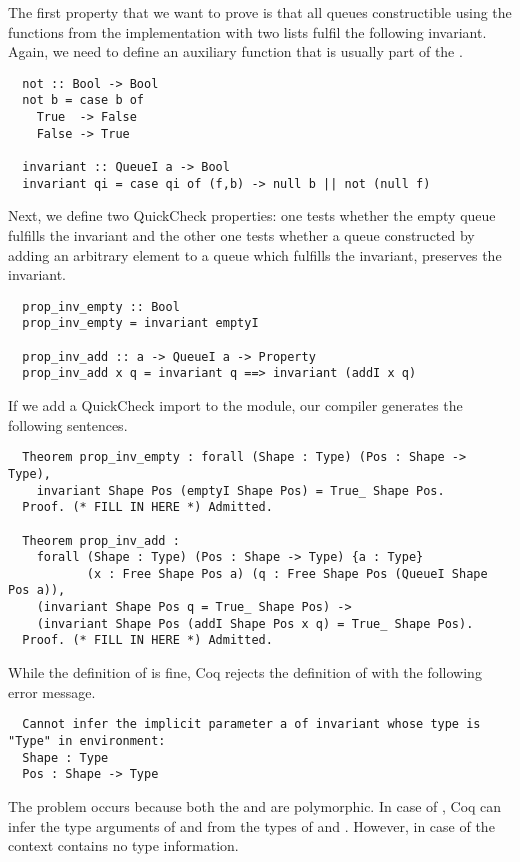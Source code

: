 The first property that we want to prove is that all queues constructible using the functions from the implementation with two lists fulfil the following invariant.
Again, we need to define an auxiliary function that is usually part of the .
\begin{verbatim}
  not :: Bool -> Bool
  not b = case b of
    True  -> False
    False -> True

  invariant :: QueueI a -> Bool
  invariant qi = case qi of (f,b) -> null b || not (null f)
\end{verbatim}
Next, we define two QuickCheck properties: one tests whether the empty queue fulfills the invariant and the other one tests whether a queue constructed by adding an arbitrary element to a queue which fulfills the invariant, preserves the invariant.
\begin{verbatim}
  prop_inv_empty :: Bool
  prop_inv_empty = invariant emptyI

  prop_inv_add :: a -> QueueI a -> Property
  prop_inv_add x q = invariant q ==> invariant (addI x q)
\end{verbatim}
If we add a QuickCheck import to the module, our compiler generates the following  sentences.
\begin{verbatim}
  Theorem prop_inv_empty : forall (Shape : Type) (Pos : Shape -> Type),
    invariant Shape Pos (emptyI Shape Pos) = True_ Shape Pos.
  Proof. (* FILL IN HERE *) Admitted.

  Theorem prop_inv_add :
    forall (Shape : Type) (Pos : Shape -> Type) {a : Type}
           (x : Free Shape Pos a) (q : Free Shape Pos (QueueI Shape Pos a)),
    (invariant Shape Pos q = True_ Shape Pos) ->
    (invariant Shape Pos (addI Shape Pos x q) = True_ Shape Pos).
  Proof. (* FILL IN HERE *) Admitted.
\end{verbatim}
While the definition of  is fine, Coq rejects the definition of  with the following error message.
\begin{verbatim}
  Cannot infer the implicit parameter a of invariant whose type is "Type" in environment:
  Shape : Type
  Pos : Shape -> Type
\end{verbatim}
The problem occurs because both the  and  are polymorphic.
In case of , Coq can infer the type arguments of  and  from the types of  and .
However, in case of  the context contains no type information.

